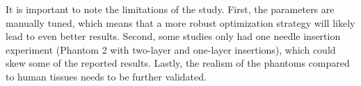  It is important to note the limitations of the study. First, the parameters are manually tuned, which means that a more robust optimization strategy will likely lead to even better results. Second, some studies only had one needle insertion experiment (Phantom 2 with two-layer and one-layer insertions), which could skew some of the reported results. Lastly, the realism of the phantoms compared to human tissues needs to be further validated.  


 \begin{table}[h]
   \centering
\caption{Model parameters tuned for each set of experiments. Ph: Phantom, Ch: Chicken, T: Table, St: Study.}
\label{tab:chap-4-params}
\end{table}
